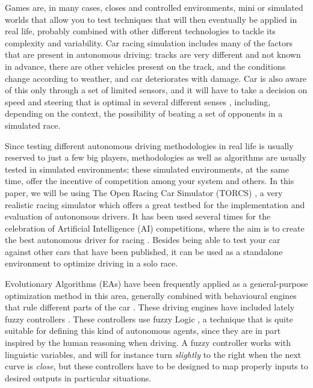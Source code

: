 \documentclass[conference]{IEEEtran}
\begin{document}

Games are, in many cases, closes and controlled environments, mini or
simulated worlds that allow you to test techniques that will then
eventually be applied in real life, probably combined with other
different technologies to tackle its complexity and variability. Car
racing simulation includes many of the factors that are present in
autonomous driving: tracks are very different and not known in
advance, there are other vehicles present on the track, and the
conditions change according to weather, and car deteriorates with
damage. Car is also aware of this only through a set of limited
sensors, and it will have to take a decision on
speed and steering that is optimal in several different
senses \cite{Autodriv2006}, including, depending on the context, the
possibility of beating a set of opponents in a simulated race.


Since testing different autonomous driving methodologies in real life is
usually reserved to just a few big players, methodologies 
as well as algorithms are usually tested in simulated environments;
these simulated environments, at the same time, offer the incentive of
competition among your system and others. In this paper, we will be
using The Open Racing Car Simulator (TORCS) \cite{torcs4}, a very
realistic racing simulator which offers a great testbed for the
implementation and evaluation of autonomous drivers.  
It has been used several times for the celebration of Artificial
Intelligence (AI) competitions, where the aim is to create the best
autonomous driver for racing
\cite{SimulatedCarRacing-2008,SimulatedCarRacing-2010,Torcs3,manualTORCS}. Besides being able to test your car against other cars that have been published, it can be used as a standalone environment to optimize driving in a
solo race. 

Evolutionary Algorithms (EAs) \cite{EAs_Back96} have been frequently
applied as a general-purpose optimization method in this area,
generally combined with behavioural engines that rule different parts
of the car
\cite{Floreano2004,CarRacing_Pelta09,SAES2012,torcs2012}. These
driving engines have included lately fuzzy controllers
\cite{Guadarrama2008, LFAG, PerezEvolvingFuzzy09}. These controllers
use fuzzy Logic \cite{Fuzzy2011}, a  technique that is quite suitable
for defining this kind of autonomous agents, since they are in part
inspired by the human reasoning when driving. A fuzzy controller works
with linguistic variables, and will for instance turn {\em slightly}
to the right when the next curve is {\em close}, but these controllers
have to be designed to map properly inputs to desired outputs in
particular situations. 
\end{document}
